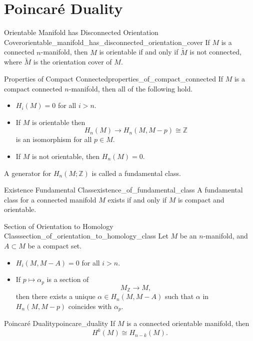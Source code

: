 \documentclass{article}
\begin{document}
\section{Poincar\'e Duality}

\begin{theorem}{Orientable Manifold has Disconnected Orientation Cover}{orientable_manifold_has_disconnected_orientation_cover}
    If $M$ is a connected $n$-manifold, then $M$ is orientable if and only if $\tilde{M}$ is not connected, where $\tilde{M}$ is the orientation cover of $M$.
\end{theorem}

\begin{theorem}{Properties of Compact Connected}{properties_of_compact_connected}
    If $M$ is a compact connected $n$-manifold, then all of the following hold.
    \begin{itemize}
        \item $H_i(M) = 0$ for all $i>n$.
        \item If $M$ is orientable then
        \[ H_n(M) \rightarrow H_n(M,M-p) \cong \mathbb{Z} \]
        is an isomorphism for all $p\in M$.
        \item If $M$ is not orientable, then $H_n(M)=0$.
    \end{itemize}
\end{theorem}

A generator for $H_n(M;\mathbb{Z})$ is called a fundamental class.
\begin{corollary}{Existence Fundamental Class}{existence_of_fundamental_class}
    A fundamental class for a connected manifold $M$ exists if and only if $M$ is compact and orientable.
\end{corollary}

\begin{lemma}{Section of Orientation to Homology Class}{section_of_orientation_to_homology_class}
    Let $M$ be an $n$-manifold, and $A\subset M$ be a compact set.
    \begin{itemize}
        \item $H_i(M,M-A) = 0$ for all $i>n$.
        \item If $p\mapsto \alpha_p$ is a section of
        \[ M_{\mathbb{Z}} \rightarrow M, \]
        then there exists a unique $\alpha\in H_n(M,M-A)$ such that $\alpha$ in $H_n(M,M-p)$ coincides with $\alpha_p$.
    \end{itemize}
\end{lemma}

\begin{theorem}{Poincar\'e Duality}{poincare_duality}
    If $M$ is a connected orientable manifold, then
    \[ H^k(M) \cong H_{n-k}(M). \]
\end{theorem}

% 
% 
\end{document}

